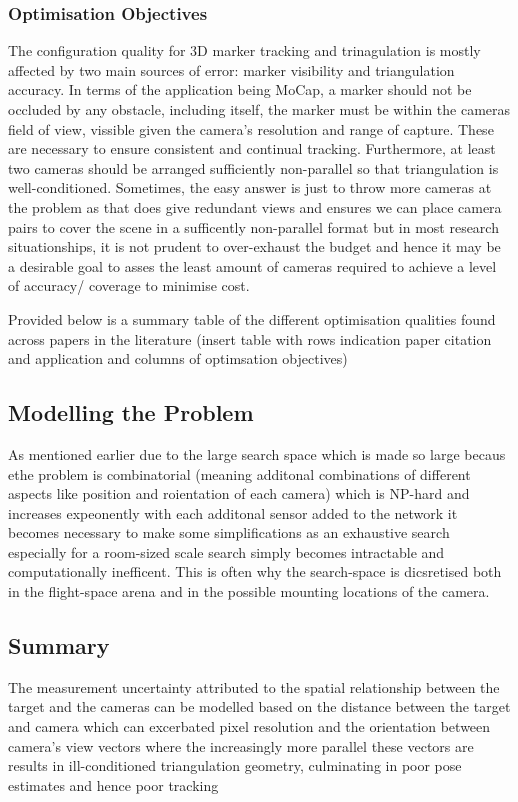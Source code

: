 \subsubsection{Optimisation Objectives}
The configuration quality for 3D marker tracking and trinagulation is mostly affected by two main sources of error: marker visibility and triangulation accuracy. In terms of the application being \gls{MoCap}, a marker should not be occluded by any obstacle, including itself, the marker must be within the cameras field of view, vissible given the camera's resolution and range of capture. These are necessary to ensure consistent and continual tracking. Furthermore, at least two cameras should be arranged sufficiently non-parallel so that triangulation is well-conditioned. Sometimes, the easy answer is just to throw more cameras at the problem as that does give redundant views and ensures we can place camera pairs to cover the scene in a sufficently non-parallel format but in most research situationships, it is not prudent to over-exhaust the budget and hence it may be a desirable goal to asses the least amount of cameras required to achieve a level of accuracy/ coverage to minimise cost.  

Provided below is a summary table of the different optimisation qualities found across papers in the literature
(insert table with rows indication paper citation and application and columns of optimsation objectives)

\subsection{Modelling the Problem}
As mentioned earlier due to the large search space which is made so large becaus ethe problem is combinatorial (meaning additonal combinations of different aspects like position and roientation of each camera) which is NP-hard and increases expeonently with each additonal sensor added to the network it becomes necessary to make some simplifications as an exhaustive search especially for a room-sized scale search simply becomes intractable and computationally inefficent. This is often why the search-space is dicsretised both in the flight-space arena and in the possible mounting locations of the camera. 

\subsection{Summary}

The measurement uncertainty attributed to the spatial relationship between the target and the cameras can be modelled based on the distance between the target and camera which can excerbated pixel resolution and the orientation between camera's view vectors where the increasingly more parallel these vectors are results in ill-conditioned triangulation geometry, culminating in poor pose estimates and hence poor tracking

